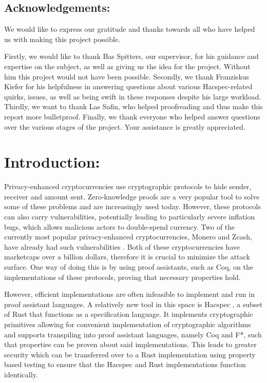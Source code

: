 \documentclass{article}
\begin{document}
\subsection*{Acknowledgements:}

We would like to express our gratitude and thanks towards all who have
helped us with making this project possible.

Firstly, we would like to thank Bas Spitters, our supervisor,
for his guidance and expertise on the subject, as well as giving
us the idea for the project. Without him this project would not
have been possible. Secondly, we thank Franziskus Kiefer for his
helpfulness in answering questions about various Hacspec-related
quirks, issues, as well as being swift in these responses despite
his large workload. Thirdly, we want to thank Las Safin, who helped
proofreading and thus make this report more bulletproof. Finally, we
thank everyone who helped answer questions over the various stages of
the project. Your assistance is greatly appreciated.

\newpage
\tableofcontents

\newpage


\section{Introduction:} \label{Introduction}

Privacy-enhanced cryptocurrencies use cryptographic protocols to hide
sender, receiver and amount sent. Zero-knowledge proofs are a very
popular tool to solve some of these problems and are increasingly
used today. However, these protocols can also carry vulnerabilities,
potentially leading to particularly severe inflation bugs, which
allows malicious actors to double-spend currency. Two of the currently
most popular privacy-enhanced cryptocurrencies, Monero and Zcash, have
already had such vulnerabilities \cite{cryptonote} \cite{zcash}. Both of
these cryptocurrencies have marketcaps over a billion dollars, therefore
it is crucial to minimize the attack surface. One way of doing this
is by using proof assistants, such as Coq, on the implementations of
these protocols, proving that necessary properties hold.

However, efficient implementations are often infeasible to implement
and run in proof assistant languages. A relatively new tool in this
space is Hacspec \cite{hacspec}, a subset of Rust that functions
as a specification language. It implements cryptographic primitives
allowing for convenient implementation of cryptographic algorithms and
supports transpiling into proof assistant languages, namely Coq and F*,
such that properties can be proven about said implementations. This
leads to greater security which can be transferred over to a Rust
implementation using property based testing to ensure that the Hacspec
and Rust implementations function identically.
\end{document}
